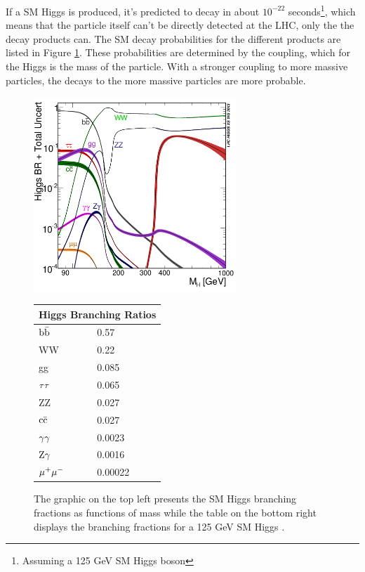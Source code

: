 If a SM Higgs is produced, it's predicted to decay in about $10^{-22}$ seconds\footnote{Assuming a 125 GeV SM Higgs boson}, which means that the particle itself can't be directly detected at the LHC, only the the decay products can. The SM decay probabilities for the different products are listed in Figure \ref{fig:hbranch}. These probabilities are determined by the coupling, which for the Higgs is the mass of the particle. With a stronger coupling to more massive particles, the decays to the more massive particles are more probable.
\begin{figure}[h!]
  \centering
  \includegraphics[width=3in]{images/Higgs_BR.png}
  \begin{tabular}{ |l|l| }
    \hline
    \multicolumn{2}{|c|}{Higgs Branching Ratios} \\
    \hline
    ${\rm b\bar{b}}$ & 0.57 \\
    WW & 0.22\\
    gg & 0.085 \\
    ${\rm \tau\tau}$ & 0.065 \\
    ZZ & 0.027 \\
    ${\rm c\bar{c}}$ & 0.027 \\
    ${\rm \gamma\gamma}$ & 0.0023 \\
    ${\rm Z}\gamma$ & 0.0016 \\
    ${\rm \mu^{+}\mu^{-}}$ & 0.00022 \\
    \hline
  \end{tabular} 
  \caption
{The graphic on the top left presents the SM Higgs branching fractions as functions of mass while the table on the bottom right displays the branching fractions for a 125 GeV SM Higgs \cite{crossbranchplots}.}
  \label{fig:hbranch}
\end{figure}

